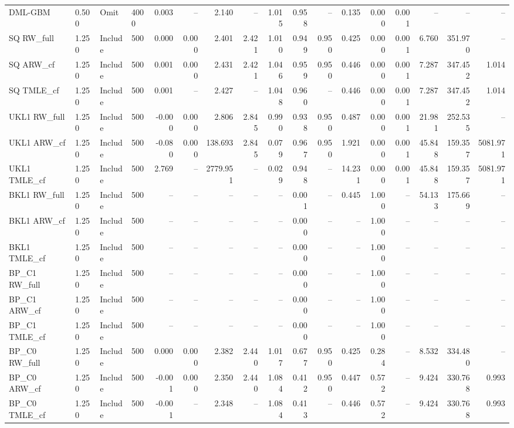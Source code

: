 \begin{tabular}{llllrrrrrrrrrrrrr}
DML-GBM & 0.500 & Omit & 4000 & 0.003 & -- & 2.140 & -- & 1.015 & 0.958 & -- & 0.135 & 0.000 & 0.001 & -- & -- & -- \\
SQ RW\_full & 1.250 & Include & 500 & 0.000 & 0.000 & 2.401 & 2.421 & 1.010 & 0.949 & 0.950 & 0.425 & 0.000 & 0.001 & 6.760 & 351.970 & -- \\
SQ ARW\_cf & 1.250 & Include & 500 & 0.001 & 0.000 & 2.431 & 2.421 & 1.046 & 0.959 & 0.950 & 0.446 & 0.000 & 0.001 & 7.287 & 347.452 & 1.014 \\
SQ TMLE\_cf & 1.250 & Include & 500 & 0.001 & -- & 2.427 & -- & 1.048 & 0.960 & -- & 0.446 & 0.000 & 0.001 & 7.287 & 347.452 & 1.014 \\
UKL1 RW\_full & 1.250 & Include & 500 & -0.000 & 0.000 & 2.806 & 2.845 & 0.990 & 0.938 & 0.950 & 0.487 & 0.000 & 0.001 & 21.981 & 252.535 & -- \\
UKL1 ARW\_cf & 1.250 & Include & 500 & -0.080 & 0.000 & 138.693 & 2.845 & 0.079 & 0.967 & 0.950 & 1.921 & 0.000 & 0.001 & 45.848 & 159.357 & 5081.971 \\
UKL1 TMLE\_cf & 1.250 & Include & 500 & 2.769 & -- & 2779.951 & -- & 0.029 & 0.948 & -- & 14.231 & 0.000 & 0.001 & 45.848 & 159.357 & 5081.971 \\
BKL1 RW\_full & 1.250 & Include & 500 & -- & -- & -- & -- & -- & 0.001 & -- & 0.445 & 1.000 & -- & 54.133 & 175.669 & -- \\
BKL1 ARW\_cf & 1.250 & Include & 500 & -- & -- & -- & -- & -- & 0.000 & -- & -- & 1.000 & -- & -- & -- & -- \\
BKL1 TMLE\_cf & 1.250 & Include & 500 & -- & -- & -- & -- & -- & 0.000 & -- & -- & 1.000 & -- & -- & -- & -- \\
BP\_C1 RW\_full & 1.250 & Include & 500 & -- & -- & -- & -- & -- & 0.000 & -- & -- & 1.000 & -- & -- & -- & -- \\
BP\_C1 ARW\_cf & 1.250 & Include & 500 & -- & -- & -- & -- & -- & 0.000 & -- & -- & 1.000 & -- & -- & -- & -- \\
BP\_C1 TMLE\_cf & 1.250 & Include & 500 & -- & -- & -- & -- & -- & 0.000 & -- & -- & 1.000 & -- & -- & -- & -- \\
BP\_C0 RW\_full & 1.250 & Include & 500 & 0.000 & 0.000 & 2.382 & 2.440 & 1.017 & 0.677 & 0.950 & 0.425 & 0.284 & -- & 8.532 & 334.480 & -- \\
BP\_C0 ARW\_cf & 1.250 & Include & 500 & -0.001 & 0.000 & 2.350 & 2.440 & 1.084 & 0.412 & 0.950 & 0.447 & 0.572 & -- & 9.424 & 330.768 & 0.993 \\
BP\_C0 TMLE\_cf & 1.250 & Include & 500 & -0.001 & -- & 2.348 & -- & 1.084 & 0.413 & -- & 0.446 & 0.572 & -- & 9.424 & 330.768 & 0.993 \\

\end{tabular}
